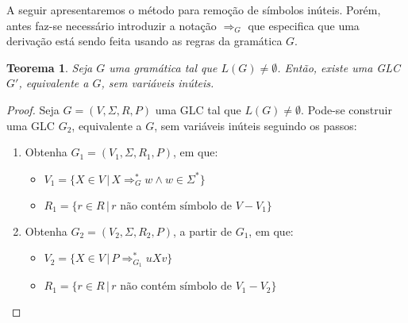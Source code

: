 \documentclass[a4paper]{article}
\newtheorem{Theorem}{Teorema}
\theoremstyle{definition}
\begin{document}
  A seguir apresentaremos o método para remoção de símbolos inúteis. Porém,
  antes faz-se necessário introduzir a notação $\Rightarrow_G$ que especifica
  que uma derivação está sendo feita usando as regras da gramática $G$.

  \begin{Theorem}\label{thmvarinutil}
    Seja $G$ uma gramática tal que $L(G) \neq \emptyset$. Então, existe uma GLC
    $G'$, equivalente a $G$, sem variáveis inúteis.
  \end{Theorem}
  \begin{proof}
    Seja $G = (V,\Sigma,R,P)$ uma GLC tal que $L(G) \neq \emptyset$. Pode-se
    construir uma GLC $G_2$, equivalente a $G$, sem variáveis inúteis seguindo
    os passos:
    \begin{enumerate}
       \item Obtenha $G_1 = (V_1, \Sigma, R_1, P)$, em que:
         \begin{itemize}
            \item $V_1 =\{X \in V\,|\, X\Rightarrow^*_Gw \land w \in \Sigma^*\}$
            \item $R_1 =\{r \in R\,|\,r \text{ não contém símbolo de } V - V_1\}$
         \end{itemize}
       \item Obtenha $G_2 = (V_2,\Sigma, R_2,P)$, a partir de $G_1$, em que:
         \begin{itemize}
           \item $V_2 =\{X \in V\,|\,P \Rightarrow^*_{G_1}uXv\}$
           \item $R_1 =\{r \in R\,|\,r \text{ não contém símbolo de } V_1 - V_2\}$  
         \end{itemize}
    \end{enumerate}
  \end{proof}
\end{document}

